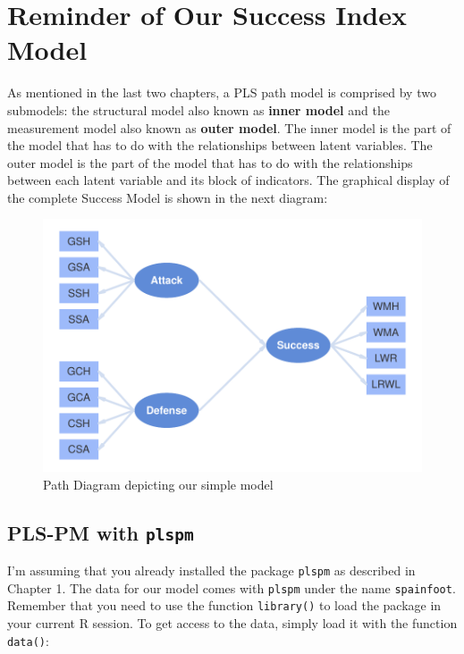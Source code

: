 \documentclass[12pt]{book}\usepackage{graphicx, color}
\newenvironment{knitrout}{}{} %
\newcommand{\plspm}{\texttt{plspm}}
\newcommand{\code}[1]{\texttt{#1}}
\begin{document}
\section{Reminder of Our Success Index Model}
As mentioned in the last two chapters, a PLS path model is comprised by two submodels: the structural model also known as \textbf{inner model} and the measurement model also known as \textbf{outer model}. The inner model is the part of the model that has to do with the relationships between latent variables. The outer model is the part of the model that has to do with the relationships between each latent variable and its block of indicators. The graphical display of the complete Success Model is shown in the next diagram:
\begin{knitrout}
\color{fgcolor}\begin{figure}[h]


{\centering \includegraphics[width=.85\linewidth,height=.5\linewidth]{figure/success_path_diagram_reminder} 

}

\caption[Path Diagram depicting our simple model]{Path Diagram depicting our simple model\label{fig:success_path_diagram_reminder}}
\end{figure}


\end{knitrout}




\subsection{PLS-PM with \plspm{}}
I'm assuming that you already installed the package \plspm{} as described in Chapter 1. The data for our model comes with \plspm{} under the name \texttt{spainfoot}. Remember that you need to use the function \code{library()} to load the package in your current R session. To get access to the data, simply load it with the function \code{data()}:
\end{document}
